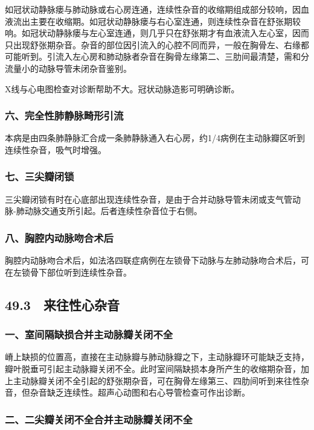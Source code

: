 如冠状动静脉瘘与肺动脉或右心房连通，连续性杂音的收缩期组成部分较响，因血液流出主要在收缩期。如冠状动静脉瘘与右心室连通，则连续性杂音在舒张期较响。如冠状动静脉瘘与左心室连通，则几乎只在舒张期才有血液流入左心室，因而只出现舒张期杂音。杂音的部位因引流入的心腔不同而异，一般在胸骨左、右缘都可能听到。引流入左心房和肺动脉者杂音在胸骨左缘第二、三肋间最清楚，需和分流量小的动脉导管未闭杂音鉴别。

X线与心电图检查对诊断帮助不大。冠状动脉造影可明确诊断。

\subsubsection{六、完全性肺静脉畸形引流}

本病是由四条肺静脉汇合成一条肺静脉通入右心房，约1/4病例在主动脉瓣区听到连续性杂音，吸气时增强。

\subsubsection{七、三尖瓣闭锁}

三尖瓣闭锁有时在心底部出现连续性杂音，是由于合并动脉导管未闭或支气管动脉-肺动脉交通支所引起。后者连续性杂音位于右侧。

\subsubsection{八、胸腔内动脉吻合术后}

胸腔内动脉吻合术后，如法洛四联症病例在左锁骨下动脉与左肺动脉吻合术后，可在左锁骨下部位听到连续性杂音。

\subsection{49.3　来往性心杂音}

\subsubsection{一、室间隔缺损合并主动脉瓣关闭不全}

嵴上缺损的位置高，直接在主动脉瓣与肺动脉瓣之下，主动脉瓣环可能缺乏支持，瓣叶脱垂可引起主动脉瓣关闭不全。此时室间隔缺损本身所产生的收缩期杂音，加上主动脉瓣关闭不全引起的舒张期杂音，可在胸骨左缘第三、四肋间听到来往性杂音，但杂音缺乏连续性。超声心动图和右心导管检查可作出诊断。

\subsubsection{二、二尖瓣关闭不全合并主动脉瓣关闭不全}


